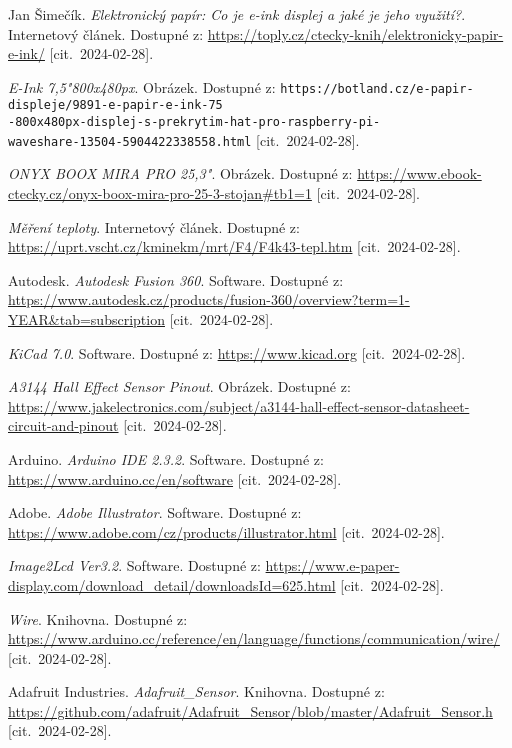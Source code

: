 \documentclass[twoside]{ctuthesis}
\theoremstyle{plain}
\theoremstyle{definition}
\theoremstyle{note}
\begin{document}
\begin{thebibliography}{99}
 Jan Šimečík. {\it Elektronický papír: Co je e-ink displej a jaké je jeho využití?}. Internetový článek. Dostupné z: \url{https://toply.cz/ctecky-knih/elektronicky-papir-e-ink/} [cit.~2024-02-28].

 {\it E-Ink 7,5"800x480px}. Obrázek. Dostupné z: {\tt https://botland.cz/e-papir-displeje/9891-e-papir-e-ink-75\\-800x480px-displej-s-prekrytim-hat-pro-raspberry-pi-\\waveshare-13504-5904422338558.html} [cit.~2024-02-28].

 {\it ONYX BOOX MIRA PRO 25,3"}. Obrázek. Dostupné z: \url{https://www.ebook-ctecky.cz/onyx-boox-mira-pro-25-3-stojan#tb1=1} [cit.~2024-02-28].

 {\it Měření teploty}. Internetový článek. Dostupné z: \url{https://uprt.vscht.cz/kminekm/mrt/F4/F4k43-tepl.htm} [cit.~2024-02-28].

 Autodesk. {\it Autodesk Fusion 360}. Software. Dostupné z: \url{https://www.autodesk.cz/products/fusion-360/overview?term=1-YEAR&tab=subscription} [cit.~2024-02-28].

 {\it KiCad 7.0}. Software. Dostupné z: \url{https://www.kicad.org} [cit.~2024-02-28].

 {\it A3144 Hall Effect Sensor Pinout}. Obrázek. Dostupné z: \url{https://www.jakelectronics.com/subject/a3144-hall-effect-sensor-datasheet-circuit-and-pinout} [cit.~2024-02-28].

 Arduino. {\it Arduino IDE 2.3.2}. Software. Dostupné z: \url{https://www.arduino.cc/en/software} [cit.~2024-02-28].

 Adobe. {\it Adobe Illustrator}. Software. Dostupné z: \url{https://www.adobe.com/cz/products/illustrator.html} [cit.~2024-02-28].

 {\it Image2Lcd Ver3.2}. Software. Dostupné z: \url{https://www.e-paper-display.com/download_detail/downloadsId=625.html} [cit.~2024-02-28].

 {\it Wire}. Knihovna. Dostupné z: \url{https://www.arduino.cc/reference/en/language/functions/communication/wire/} [cit.~2024-02-28].

 Adafruit Industries. {\it \hbox{Adafruit\_Sensor}}. Knihovna. Dostupné z: \url{https://github.com/adafruit/Adafruit_Sensor/blob/master/Adafruit_Sensor.h} [cit.~2024-02-28].


\end{thebibliography}
\end{document}
